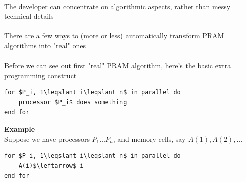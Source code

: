 \documentclass{article}[18pt]
\newcommand{\seq}[3]{#1_{#2}\ldots#1_{#3}}
\begin{document}
\\
The developer can concentrate on algorithmic aspects, rather than messy technical details\\
\\
There are a few ways to (more or less) automatically transform PRAM algorithms into "real" ones\\
\\
Before we can see out first "real" PRAM algorithm, here's the basic extra programming construct
\begin{lstlisting}
for $P_i, 1\leqslant i\leqslant n$ in parallel do
	processor $P_i$ does something
end for	
\end{lstlisting}
\textbf{Example}\\
Suppose we have processors $\seq{P}{1}{n}$, and memory cells, say $A(1),A(2),...$
\begin{lstlisting}
for $P_i, 1\leqslant i\leqslant n$ in parallel do
	A(i)$\leftarrow$ i
end for	
\end{lstlisting}
\end{document}
